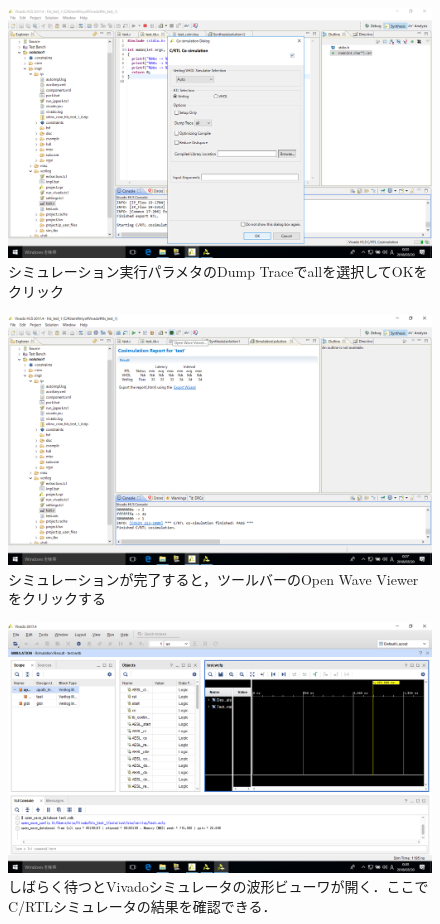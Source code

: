 \documentclass[a4paper,dvipdfmx]{jsarticle}
\begin{document}
 \begin{figure}[H]
  \begin{center}
   \includegraphics[width=.8\textwidth]{chapter08_figures/VirtualBox_Windows10_20_03_2018_00_23_15.png}
  \end{center}
  \caption{シミュレーション実行パラメタのDump Traceでallを選択してOKをクリック}
 \end{figure}

 \begin{figure}[H]
  \begin{center}
   \includegraphics[width=.8\textwidth]{chapter08_figures/VirtualBox_Windows10_20_03_2018_00_27_29.png}
  \end{center}
  \caption{シミュレーションが完了すると，ツールバーのOpen Wave Viewerをクリックする}
 \end{figure}

 \begin{figure}[H]
  \begin{center}
   \includegraphics[width=.8\textwidth]{chapter08_figures/VirtualBox_Windows10_20_03_2018_00_30_04.png}
  \end{center}
  \caption{しばらく待つとVivadoシミュレータの波形ビューワが開く．ここでC/RTLシミュレータの結果を確認できる．}
 \end{figure}
\end{document}
